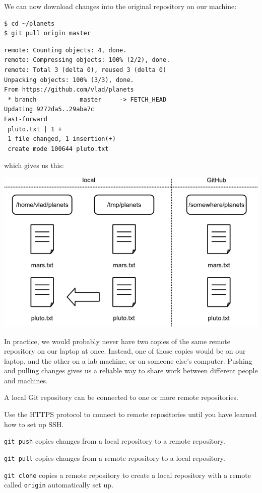 \documentclass{book}
\begin{document}
We can now download changes into the original repository on our machine:

\begin{verbatim}
$ cd ~/planets
$ git pull origin master
\end{verbatim}

\begin{verbatim}
remote: Counting objects: 4, done.
remote: Compressing objects: 100% (2/2), done.
remote: Total 3 (delta 0), reused 3 (delta 0)
Unpacking objects: 100% (3/3), done.
From https://github.com/vlad/planets
 * branch            master     -> FETCH_HEAD
Updating 9272da5..29aba7c
Fast-forward
 pluto.txt | 1 +
 1 file changed, 1 insertion(+)
 create mode 100644 pluto.txt
\end{verbatim}

which gives us this:

\includegraphics{novice/git/img/git-after-pulling-to-local-repo.png}

In practice, we would probably never have two copies of the same remote
repository on our laptop at once. Instead, one of those copies would be
on our laptop, and the other on a lab machine, or on someone else's
computer. Pushing and pulling changes gives us a reliable way to share
work between different people and machines.

\begin{keypoints}
\begin{swcitemize}
\item
  A local Git repository can be connected to one or more remote
  repositories.
\item
  Use the HTTPS protocol to connect to remote repositories until you
  have learned how to set up SSH.
\item
  \texttt{git push} copies changes from a local repository to a remote
  repository.
\item
  \texttt{git pull} copies changes from a remote repository to a local
  repository.
\item
  \texttt{git clone} copies a remote repository to create a local
  repository with a remote called \texttt{origin} automatically set up.
\end{swcitemize}
\end{keypoints}
\end{document}
